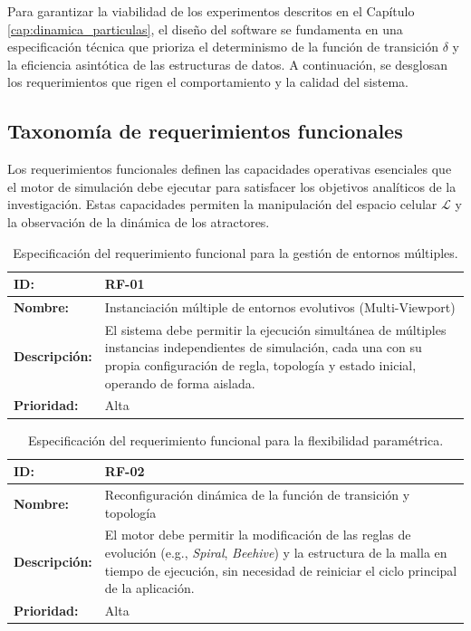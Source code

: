 Para garantizar la viabilidad de los experimentos descritos en el Capítulo \ref{cap:dinamica_particulas}, el diseño del software se fundamenta en una especificación técnica que prioriza el determinismo de la función de transición $\delta$ y la eficiencia asintótica de las estructuras de datos. A continuación, se desglosan los requerimientos que rigen el comportamiento y la calidad del sistema.

\subsection{Taxonomía de requerimientos funcionales}

Los requerimientos funcionales definen las capacidades operativas esenciales que el motor de simulación debe ejecutar para satisfacer los objetivos analíticos de la investigación. Estas capacidades permiten la manipulación del espacio celular $\mathcal{L}$ y la observación de la dinámica de los atractores.

\begin{table}[ht]
\centering
\begin{tabular}{|l|p{10cm}|}
\hline
\textbf{ID:} & \textbf{RF-01} \\ \hline
\textbf{Nombre:} & Instanciación múltiple de entornos evolutivos (Multi-Viewport) \\ \hline
\textbf{Descripción:} & El sistema debe permitir la ejecución simultánea de múltiples instancias independientes de simulación, cada una con su propia configuración de regla, topología y estado inicial, operando de forma aislada. \\ \hline
\textbf{Prioridad:} & Alta \\ \hline
\end{tabular}
\caption{Especificación del requerimiento funcional para la gestión de entornos múltiples.}
\label{tab:rf01}
\end{table}

\begin{table}[ht]
\centering
\begin{tabular}{|l|p{10cm}|}
\hline
\textbf{ID:} & \textbf{RF-02} \\ \hline
\textbf{Nombre:} & Reconfiguración dinámica de la función de transición y topología \\ \hline
\textbf{Descripción:} & El motor debe permitir la modificación de las reglas de evolución (e.g., \textit{Spiral}, \textit{Beehive}) y la estructura de la malla en tiempo de ejecución, sin necesidad de reiniciar el ciclo principal de la aplicación. \\ \hline
\textbf{Prioridad:} & Alta \\ \hline
\end{tabular}
\caption{Especificación del requerimiento funcional para la flexibilidad paramétrica.}
\label{tab:rf02}
\end{table}

